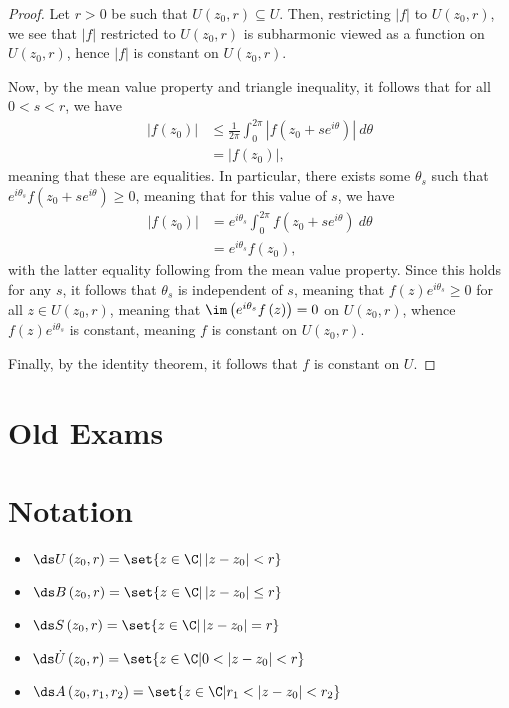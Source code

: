 \documentclass[10pt]{mypackage}
\begin{document}
\begin{proof}
  Let $r > 0$ be such that $U\left( z_0,r \right)\subseteq U$. Then, restricting $\left\vert f \right\vert$ to $U\left( z_0,r \right)$, we see that $\left\vert f \right\vert$ restricted to $U\left( z_0,r \right)$ is subharmonic viewed as a function on $U\left( z_0,r \right)$, hence $\left\vert f \right\vert$ is constant on $U\left( z_0,r \right)$.\newline

  Now, by the mean value property and triangle inequality, it follows that for all $0 < s < r$, we have
  \begin{align*}
    \left\vert f\left( z_0 \right) \right\vert &\leq \frac{1}{2\pi} \int_{0}^{2\pi} \left\vert f\left( z_0 + se^{i\theta} \right) \right\vert\:d\theta\\
                                               &= \left\vert f\left( z_0 \right) \right\vert,
  \end{align*}
  meaning that these are equalities. In particular, there exists some $\theta_s$ such that $e^{i\theta_s} f\left( z_0 + se^{i\theta} \right) \geq 0$, meaning that for this value of $s$, we have
  \begin{align*}
    \left\vert f\left( z_0 \right) \right\vert &= e^{i\theta_s} \int_{0}^{2\pi} f\left( z_0 + se^{i\theta} \right)\:d\theta\\
                                               &= e^{i\theta_s} f\left( z_0 \right),
  \end{align*}
  with the latter equality following from the mean value property. Since this holds for any $s$, it follows that $\theta_s$ is independent of $s$, meaning that $f(z)e^{i\theta_s} \geq 0$ for all $z\in U\left( z_0,r \right)$, meaning that $\im\left( e^{i\theta_s}f\left( z \right) \right) = 0$ on $U\left( z_0,r \right)$, whence $f(z)e^{i\theta_s}$ is constant, meaning $f$ is constant on $U\left( z_0,r \right)$.\newline

  Finally, by the identity theorem, it follows that $f$ is constant on $U$.
\end{proof}
\section{Old Exams}%
\section{Notation}%
\begin{itemize}
  \item $\ds U\left( z_0,r \right) = \set{z\in \C | \left\vert z-z_0 \right\vert < r}$
  \item $\ds B\left( z_0,r \right) = \set{z\in \C | \left\vert z-z_0 \right\vert \leq r}$
  \item $\ds S\left( z_0,r \right) = \set{z\in \C | \left\vert z-z_0 \right\vert = r}$
  \item $\ds \dot{U}\left( z_0,r \right) = \set{z\in \C | 0 < \left\vert z-z_0 \right\vert < r}$
  \item $\ds A\left( z_0,r_1,r_2 \right) = \set{z\in \C | r_1 < \left\vert z-z_0 \right\vert < r_2}$
\end{itemize}
\end{document}
